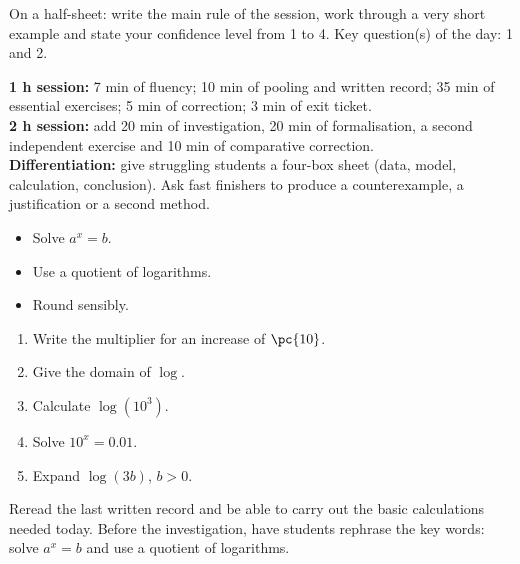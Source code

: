 \begin{exitticket}[3 minutes]On a half-sheet: write the main rule of the session, work through a very short example and state your confidence level from 1 to 4. Key question(s) of the day: 1 and 2.\end{exitticket}

\ifmxteacher
\begin{method}
\textbf{1 h session:} 7 min of fluency; 10 min of pooling and written record; 35 min of essential exercises; 5 min of correction; 3 min of exit ticket.\\
\textbf{2 h session:} add 20 min of investigation, 20 min of formalisation, a second independent exercise and 10 min of comparative correction.\\
\textbf{Differentiation:} give struggling students a four-box sheet (data, model, calculation, conclusion). Ask fast finishers to produce a counterexample, a justification or a second method.
\end{method}
\fi
{}
\begin{objectives}\begin{itemize}\item Solve $a^x=b$.\item Use a quotient of logarithms.\item Round sensibly.\end{itemize}\end{objectives}
\begin{fluency}\begin{enumerate}\item Write the multiplier for an increase of $\pc{10}$. \item Give the domain of $\log$. \mxblank{$]0,+\infty[$}\item Calculate $\log(10^3)$. \item Solve $10^x=\num{0,01}$. \item Expand $\log(3b)$, $b>0$. \end{enumerate}\end{fluency}
\begin{prerequisites}Reread the last written record and be able to carry out the basic calculations needed today. Before the investigation, have students rephrase the key words: solve $a^x=b$ and use a quotient of logarithms.\end{prerequisites}

